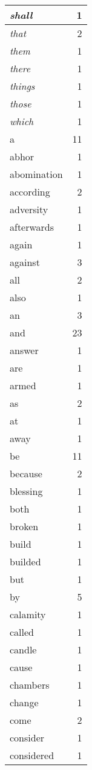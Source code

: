 \begin{center}
\begin{longtable}{l|r}
\emph{shall} & 1\\ \hline 
\emph{that} & 2\\ \hline 
\emph{them} & 1\\ \hline 
\emph{there} & 1\\ \hline 
\emph{things} & 1\\ \hline 
\emph{those} & 1\\ \hline 
\emph{which} & 1\\ \hline 
a & 11\\ \hline 
abhor & 1\\ \hline 
abomination & 1\\ \hline 
according & 2\\ \hline 
adversity & 1\\ \hline 
afterwards & 1\\ \hline 
again & 1\\ \hline 
against & 3\\ \hline 
all & 2\\ \hline 
also & 1\\ \hline 
an & 3\\ \hline 
and & 23\\ \hline 
answer & 1\\ \hline 
are & 1\\ \hline 
armed & 1\\ \hline 
as & 2\\ \hline 
at & 1\\ \hline 
away & 1\\ \hline 
be & 11\\ \hline 
because & 2\\ \hline 
blessing & 1\\ \hline 
both & 1\\ \hline 
broken & 1\\ \hline 
build & 1\\ \hline 
builded & 1\\ \hline 
but & 1\\ \hline 
by & 5\\ \hline 
calamity & 1\\ \hline 
called & 1\\ \hline 
candle & 1\\ \hline 
cause & 1\\ \hline 
chambers & 1\\ \hline 
change & 1\\ \hline 
come & 2\\ \hline 
consider & 1\\ \hline 
considered & 1\\ \hline 

\end{longtable}
\end{center}
